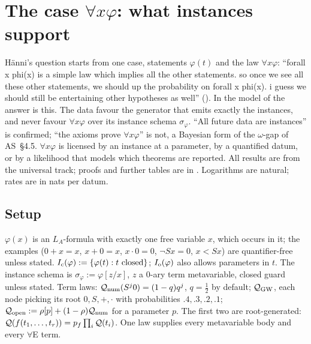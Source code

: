 
\section{The case \texorpdfstring{$\forall x\varphi$}{forall x phi}: what instances support}\label{sec:univ}

H\"anni's question starts from one case, statements $\varphi(t)$ and the law $\forall x\varphi$: ``forall x phi(x) is a simple law which implies all the other statements. so once we see all these other statements, we should up the probability on forall x phi(x). i guess we should still be entertaining other hypotheses as well'' (). In the model of  the answer is this. The data favour the generator that emits exactly the instances, and never favour $\forall x\varphi$ over its instance schema $\sigma_\varphi$. ``All future data are instances'' is confirmed; ``the axioms prove $\forall x\varphi$'' is not, a Bayesian form of the $\omega$-gap of AS~\S4.5. $\forall x\varphi$ is licensed by an instance at a parameter, by a quantified datum, or by a likelihood that models which theorems are reported. All results are from the universal track; proofs and further tables are in . Logarithms are natural; rates are in nats per datum.

\subsection{Setup}\label{sec:univ:setup}

\begin{definition}\label{def:univ:setup}
$\varphi(x)$ is an $L_A$-formula with exactly one free variable $x$, which occurs in it; the examples ($0+x=x$, $x+0=x$, $x\cdot0=0$, $\neg Sx=0$, $x<Sx$) are quantifier-free unless stated. $I_{\mathrm{c}}(\varphi):=\{\varphi(t):t\text{ closed}\}$; $I_{\mathrm{o}}(\varphi)$ also allows parameters in $t$. The instance schema is $\sigma_\varphi:=\varphi[z/x]$, $z$ a $0$-ary term metavariable, closed guard unless stated. Term laws: $\mathcal{Q}_{\mathrm{num}}(S^j0)=(1-q)q^j$, $q=\tfrac12$ by default; $\mathcal{Q}_{\mathrm{GW}}$, each node picking its root $0,S,+,\cdot$ with probabilities $.4,.3,.2,.1$; $\mathcal{Q}_{\mathrm{open}}:=\rho[p]+(1-\rho)\mathcal{Q}_{\mathrm{num}}$ for a parameter $p$. The first two are root-generated: $\mathcal{Q}(f(t_1,\dots,t_r))=p_f\prod_i\mathcal{Q}(t_i)$. One law supplies every metavariable body and every $\forall$E term.
\end{definition}

